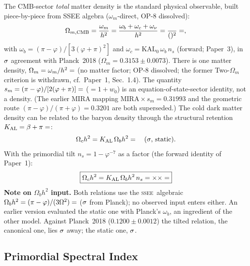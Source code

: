 \documentclass[12pt,a4paper]{article}
\newcommand{\SSEE}{\ifmmode\mathrm{SSEE}\else\textsc{ssee}\fi}
\begin{document}
The CMB-sector \emph{total} matter density is the standard physical
observable, built piece-by-piece from SSEE algebra ($\omega_m$-direct,
OP-8 dissolved):
\begin{equation}
\Omega_{m,\rm CMB} = \frac{\omega_m}{h^2}
  = \frac{\omega_b+\omega_c+\omega_\nu}{h^2}
  = \frac{\val{OMEGA_M_H2_d5}}{(\val{H_GLOBAL_h_d5})^2} = \val{OMEGA_M_TOTAL_d6},
\end{equation}
with $\omega_b=(\pi-\varphi)/[3(\varphi+\pi)^2]$ and
$\omega_c=\mathrm{KAL_0}\,\omega_b\,n_s$ (forward; Paper~3), in $\val{om_planck_sig}\sigma$
agreement with Planck~2018 ($\Omega_m = 0.3153\pm0.0073$). There is one matter
density, $\Omega_m=\omega_m/h^2=\val{OMEGA_M_TOTAL_d6}$ (no matter factor; OP-8 dissolved;
the former Two-$\Omega_m$ criterion is withdrawn, cf.\ Paper~1, Sec.~1.4).
The quantity $s_m=(\pi-\varphi)/[2(\varphi+\pi)]=\val{S_M_d6}$ ($=1+w_0$) is an
equation-of-state-sector identity, not a density. (The earlier MIRA mapping
$\mathrm{MIRA}\times s_m=0.31993$ and the geometric route
$(\pi-\varphi)/(\pi+\varphi)=0.3201$ are both superseded.)
The cold dark matter density can be related to the baryon density through the
structural retention $K_{\rm AL} = \beta + \pi = \val{KAL0_d6}$:
\begin{equation}
\Omega_c h^2 = K_{\rm AL}\,\Omega_b h^2 = \val{wc_estatico_ssee_d4} \quad (\val{wc_estatico_ssee_sigma}\sigma\text{, static}).
\label{eq:omch2_static}
\end{equation}
With the primordial tilt $n_s = 1-\varphi^{-7}$ as a factor (the forward identity of
Paper~1):
\begin{equation}
\boxed{\Omega_c h^2 = K_{\rm AL}\,\Omega_b h^2\,n_s
      = \val{KAL0_d6}\times \val{OMEGA_B_H2_d6}\times \val{N_S_d5} = \val{OMEGA_C_H2_d6}}
\label{eq:omch2_IS}
\end{equation}
\textbf{Note on $\Omega_b h^2$ input.}
Both relations use the \SSEE\ algebraic
$\Omega_b h^2 = (\pi-\varphi)/(3\Omega^2) = \val{OMEGA_B_H2_d6}$ ($\val{wb_planck_sig}\sigma$ from Planck);
no observed input enters either. An earlier version evaluated the static one with
Planck's $\omega_b$, an ingredient of the other model.
Against Planck~2018 ($0.1200\pm0.0012$) the tilted relation, the canonical one, lies
$\val{wc_ns_sigma_abs}\sigma$ away; the static one, $\val{wc_estatico_ssee_sigma}\sigma$.

\subsection{Primordial Spectral Index}
\label{sec:ns}
\end{document}
